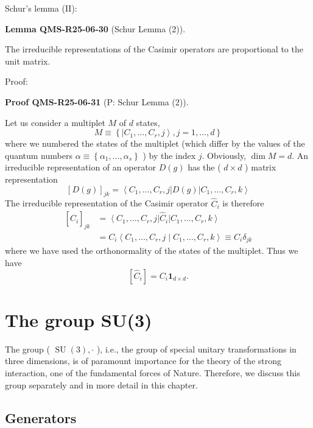 \documentclass[10pt, letterpaper]{article}
\newcommand{\CustomHeading}[3]{%
  \par\medskip\noindent%
  \textbf{#1 #2} \textnormal{(#3)}.\enskip%
}
\newenvironment{LEM}[2]{\begin{unitbox}\CustomHeading{Lemma}{#1}{#2}}{\end{unitbox}}
\newenvironment{PROOF}[2]{\begin{unitbox}\CustomHeading{Proof}{#1}{#2}}{\end{unitbox}}
\begin{document}
Schur's lemma (II): 

\begin{LEM}{QMS-R25-06-30}{Schur Lemma (2)}
The irreducible representations of the Casimir operators are proportional to the unit matrix.
\end{LEM}


Proof: 

\begin{PROOF}{QMS-R25-06-31}{P: Schur Lemma (2)}
Let us consider a multiplet $M$ of $d$ states,
$$
M \equiv\left\{\left|C_{1}, \ldots, C_{r}, j\right\rangle, j=1, \ldots, d\right\}
$$
where we numbered the states of the multiplet (which differ by the values of the quantum numbers $\alpha \equiv\left\{\alpha_{1}, \ldots, \alpha_{s}\right\}$ ) by the index $j$. Obviously, $\operatorname{dim} M=d$. An irreducible representation of an operator $D(g)$ has the ( $d \times d$ ) matrix representation
$$
[D(g)]_{j k}=\left\langle C_{1}, \ldots, C_{r}, j\right| D(g)\left|C_{1}, \ldots, C_{r}, k\right\rangle
$$
The irreducible representation of the Casimir operator $\hat{C}_{i}$ is therefore
$$
\begin{aligned}
{\left[\hat{C}_{i}\right]_{j k} } & =\left\langle C_{1}, \ldots, C_{r}, j\right| \hat{C}_{i}\left|C_{1}, \ldots, C_{r}, k\right\rangle \\
& =C_{i}\left\langle C_{1}, \ldots, C_{r}, j \mid C_{1}, \ldots, C_{r}, k\right\rangle \equiv C_{i} \delta_{j k}
\end{aligned}
$$
where we have used the orthonormality of the states of the multiplet. Thus we have
$$
\left[\hat{C}_{i}\right]=C_{i} \mathbf{1}_{d \times d}.
$$
\end{PROOF}






\pagebreak


\section{The group SU(3)}
The group ( $\operatorname{SU}(3), \cdot$ ), i.e., the group of special unitary transformations in three dimensions, is of paramount importance for the theory of the strong interaction, one of the fundamental forces of Nature. Therefore, we discuss this group separately and in more detail in this chapter.



\subsection{Generators}
\end{document}
